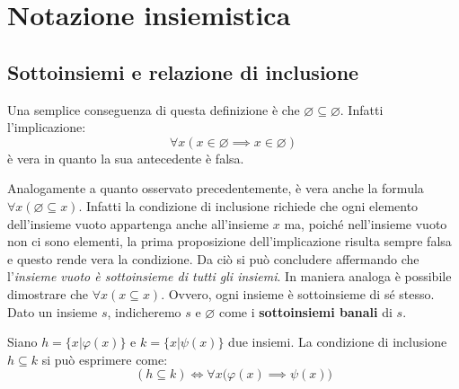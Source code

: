 \section{Notazione insiemistica}
\subsection{Sottoinsiemi e relazione di inclusione}


\begin{osservation}
	Una semplice conseguenza di questa definizione è che $\varnothing \subseteq \varnothing$. Infatti l'implicazione:
	\begin{displaymath}
		\forall x ( x \in \varnothing \implies x \in \varnothing)
	\end{displaymath}
	è vera in quanto la sua antecedente è falsa.
\end{osservation}

Analogamente a quanto osservato precedentemente, è vera anche la formula $\forall x (\varnothing \subseteq x)$. Infatti la condizione di inclusione richiede che ogni elemento dell'insieme vuoto appartenga anche all'insieme $x$ ma, poiché nell'insieme vuoto non ci sono elementi, la prima proposizione dell'implicazione risulta sempre falsa e questo rende vera la condizione. Da ciò si può concludere affermando che l'\textit{insieme vuoto è sottoinsieme di tutti gli insiemi}. In maniera analoga è possibile dimostrare che $\forall x (x \subseteq x)$. Ovvero, ogni insieme è sottoinsieme di sé stesso. Dato un insieme $s$, indicheremo $s$ e $\varnothing$ come i \textbf{sottoinsiemi banali} di $s$.


\begin{lemmabox}
	Siano $h=\{x|\varphi(x)\}$ e $k=\{x|\psi(x)\}$ due insiemi. La condizione di inclusione $h \subseteq k$ si può esprimere come:
	\begin{equation}
		(h \subseteq k) \iff \forall x \bigl( \varphi(x) \implies \psi(x)   \bigr)
	\end{equation}
\end{lemmabox}

